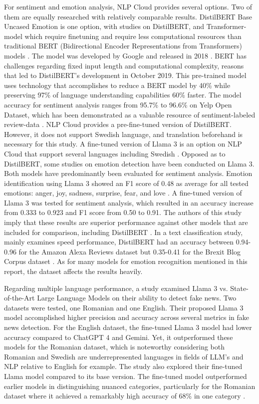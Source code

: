 For sentiment and emotion analysis, NLP Cloud provides several options. Two of them are equally researched with relatively comparable results. DistilBERT Base Uncased Emotion is one option, with studies on DistilBERT, and Transformer-model which require finetuning and require less computational resources than traditional BERT (Bidirectional Encoder Representations from Transformers) models \autocite{NLPCloud}. The model was developed by Google and released in 2018 \autocite {Qazi2025}. BERT has challenges regarding fixed input length and computational complexity, reasons that led to DistilBERT’s development in October 2019. This pre-trained model uses technology that accomplishes to reduce a BERT model by 40\% while preserving 97\% of language understanding capabilities 60\% faster. The model accuracy for sentiment analysis ranges from 95.7\% to 96.6\% on Yelp Open Dataset, which has been demonstrated as a valuable resource of sentiment-labeled review-data \autocite{Areshey2024}. NLP Cloud provides a pre-fine-tuned version of DistilBERT. However, it does not support Swedish language, and translation beforehand is necessary for this study. A fine-tuned version of Llama 3 is an option on NLP Cloud that support several languages including Swedish \autocite{NLPCloud}. Opposed as to DistilBERT, some studies on emotion detection have been conducted on Llama 3. Both models have predominantly been evaluated for sentiment analysis. Emotion identification using Llama 3 showed an F1 score of 0.48 as average for all tested emotions: anger, joy, sadness, surprise, fear, and love \autocite{Zhang2024}. A fine-tuned version of Llama 3 was tested for sentiment analysis, which resulted in an accuracy increase from 0.333 to 0.923 and F1 score from 0.50 to 0.91. The authors of this study imply that these results are superior performance against other models that are included for comparison, including DistilBERT \autocite{Kumar2024}. In a text classification study, mainly examines speed performance, DistilBERT had an accuracy between 0.94-0.96 for the Amazon Alexa Reviews dataset but 0.35-0.41 for the Brexit Blog Corpus dataset \autocite{SilvaBarbon2022}. As for many models for emotion recognition mentioned in this report, the dataset affects the results heavily. 

Regarding multiple language performance, a study examined Llama 3 vs. State-of-the-Art Large Language Models on their ability to detect fake news. Two datasets were tested, one Romanian and one English. Their proposed Llama 3 model accomplished higher precision and accuracy across several metrics in fake news detection. For the English dataset, the fine-tuned Llama 3 model had lower accuracy compared to ChatGPT 4 and Gemini. Yet, it outperformed these models for the Romanian dataset, which is noteworthy considering both Romanian and Swedish are underrepresented languages in fields of LLM’s and NLP relative to English for example. The study also explored their fine-tuned Llama model compared to its base version. The fine-tuned model outperformed earlier models in distinguishing nuanced categories, particularly for the Romanian dataset where it achieved a remarkably high accuracy of 68\% in one category \autocite{Repede2024}.

